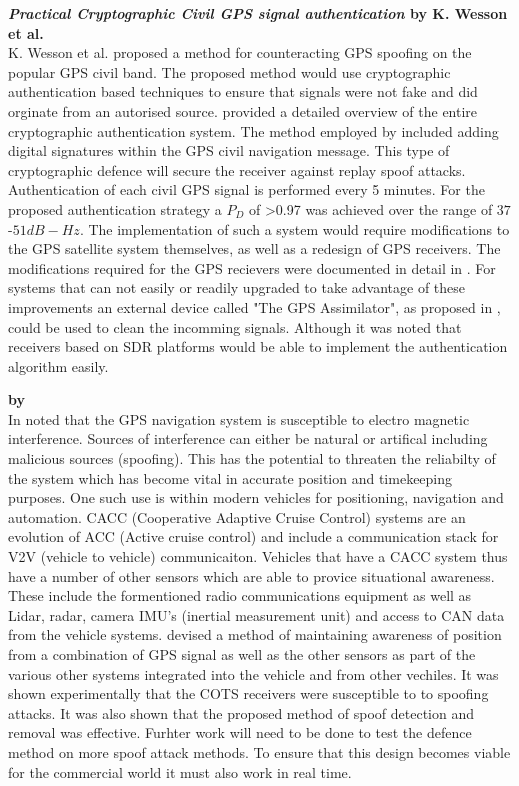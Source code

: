\textbf{\emph{Practical Cryptographic Civil GPS signal authentication} by K. Wesson et al.} \\
K. Wesson et al. \cite{RN13} proposed a method for counteracting GPS spoofing on the popular GPS civil band. The proposed method would use cryptographic
authentication based techniques to ensure that signals were not fake and did orginate from an autorised source.
\citeauthor{RN13} provided a detailed overview of the entire cryptographic authentication system.
The method employed by \citeauthor{RN13} included adding digital signatures within the GPS civil navigation message. This type of cryptographic defence
will secure the receiver against replay spoof attacks. Authentication of each civil GPS signal is performed every 5 minutes.
For the proposed authentication strategy a $P_D$ of >0.97 was achieved over the range of $37$-$51 dB-Hz$.
The implementation of such a system would require modifications to the GPS satellite system themselves, as well as a redesign of GPS receivers.
The modifications required for the GPS recievers were documented in detail in \cite{RN13}. For systems that can not easily or readily upgraded to
take advantage of these improvements an external device called "The GPS Assimilator", as proposed in \cite{RN19}, could be used to clean the incomming
signals.
Although it was noted that receivers based on SDR platforms would be able to implement the authentication algorithm easily.

\medskip

\textbf{\emph{} by \citeauthor{RN17}} \\
In \citeyear{RN17} \citeauthor{RN17} \cite{RN17} noted that the GPS navigation system is susceptible to electro magnetic interference. Sources of interference 
can either be natural or artifical including malicious sources (spoofing). This has the potential to threaten the reliabilty of the system which has become 
vital in accurate position and timekeeping purposes. One such use is within modern vehicles for positioning, navigation and automation. 
CACC (Cooperative Adaptive Cruise Control) systems are an evolution of ACC (Active cruise control) and include a communication stack for V2V (vehicle to vehicle) communicaiton. 
Vehicles that have a CACC system thus have a number of other sensors which are able to provice situational awareness. These include the formentioned radio
communications equipment as well as Lidar, radar, camera  IMU's (inertial measurement unit) and access to CAN data from the vehicle systems.
\citeauthor{RN17} devised a method of maintaining awareness of position from a combination of GPS signal as well as the other sensors as part of
the various other systems integrated into the vehicle and from other vechiles. It was shown experimentally that the COTS receivers were susceptible to
to spoofing attacks. It was also shown that the proposed method of spoof detection and removal was effective. Furhter work will need to be done
to test the defence method on more spoof attack methods. To ensure that this design becomes viable for the commercial world it must also work in real time.

